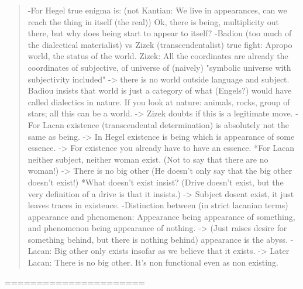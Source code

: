 \documentclass[10pt]{book}
\begin{document}
\begin{quotation}
-For Hegel true enigma is: (not Kantian: We live in appearances, can we reach the thing in itself (the real)) Ok, there is being, multiplicity out there, but why does being start to appear to itself?
-Badiou (too much of the dialectical materialist) vs Zizek (transcendentalist) true fight: Apropo world, the status of the world. Zizek: All the coordinates are already the coordinates of subjective, of universe of (naively) "symbolic universe with subjectivity included" -> there is no world outside language and subject. Badiou insists that world is just a category of what (Engels?) would have called dialectics in nature. If you look at nature: animals, rocks, group of stars; all this can be a world. -> Zizek doubts if this is a legitimate move.
-For Lacan existence (transcendental determination) is absolutely not the same as being. -> In Hegel existence is being which is appearance of some essence. -> For existence you already have to have an essence. 
	*For Lacan neither subject, neither woman exist. (Not to say that there are no woman!) -> There is no big other (He doesn't only say that the big other doesn't exist!) 
	*What doesn't exist insist? (Drive doesn't exist, but the very definition of a drive is that it insists.) -> Subject dosent exist, it just leaves traces in existence.
-Distinction between (in strict lacanian terms) appearance and phenomenon: Appearance being appearance of something, and phenomenon being appearance of nothing. -> (Just raises desire for something behind, but there is nothing behind) appearance is the abyss.
-Lacan: Big other only exists insofar as we believe that it exists. -> Later Lacan: There is no big other. It's non functional even as non existing.
\end{quotation}
======================
\end{document}
